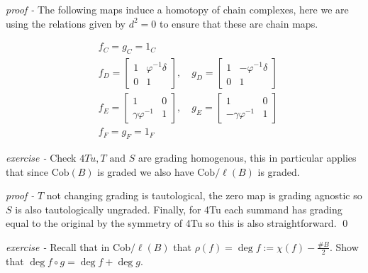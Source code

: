 \documentclass[11pt]{article}
\theoremstyle{definition}
\newcommand{\tand}{\text{ and }}
\begin{document}
    \emph{proof - } The following maps induce a homotopy of chain complexes, here we are using the relations given by \(d^2 = 0\) to ensure that these are chain maps.

    \begin{align*}
        &f_C = g_C = 1_C \\
        &f_D = \begin{bmatrix} 1 & \varphi^{-1}\delta \\ 0 & 1\end{bmatrix}, \quad g_D = \begin{bmatrix} 1 & -\varphi^{-1}\delta \\ 0 & 1\end{bmatrix} \\
        &f_E = \begin{bmatrix} 1 & 0\\ \gamma \varphi^{-1} & 1 \end{bmatrix}, \quad g_E = \begin{bmatrix} 1 & 0\\ -\gamma \varphi^{-1} & 1 \end{bmatrix} \\
        &f_F = g_F = 1_F
    \end{align*}



    \emph{exercise - } Check \(4Tu, T \tand S\) are grading homogenous, this in particular applies that since \(\text{Cob}(B)\) is graded we also have \(\text{Cob}/\ell(B)\) is graded.

    \emph{proof - } \(T\) not changing grading is tautological, the zero map is grading agnostic so \(S\) is also tautologically ungraded. Finally, for 4Tu each summand has grading equal to the original by the symmetry of 4Tu so this is also straightforward. \qed



    \emph{exercise - } Recall that in \(\text{Cob}/\ell(B)\) that \(\rho(f) = \deg f := \chi(f) - \frac{\#B}{2}\). Show that \(\deg f\circ g = \deg f + \deg g\).
\end{document}
